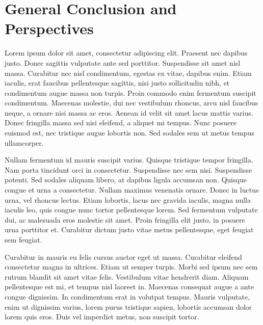 \chapter*{General Conclusion and Perspectives}




\label{chap:general-conclusion}

Lorem ipsum dolor sit amet, consectetur adipiscing elit. Praesent nec dapibus justo. Donec sagittis vulputate ante sed porttitor. Suspendisse sit amet nisl massa. Curabitur nec nisl condimentum, egestas ex vitae, dapibus enim. Etiam iaculis, erat faucibus pellentesque sagittis, nisi justo sollicitudin nibh, et condimentum augue massa non turpis. Proin commodo enim fermentum suscipit condimentum. Maecenas molestie, dui nec vestibulum rhoncus, arcu nisl faucibus neque, a ornare nisi massa ac eros. Aenean id velit sit amet lacus mattis varius. Donec fringilla massa sed nisi eleifend, a aliquet mi tempus. Nunc posuere euismod est, nec tristique augue lobortis non. Sed sodales sem ut metus tempus ullamcorper.

Nullam fermentum id mauris suscipit varius. Quisque tristique tempor fringilla. Nam porta tincidunt orci in consectetur. Suspendisse nec sem nisi. Suspendisse potenti. Sed sodales aliquam libero, at dapibus ligula accumsan non. Quisque congue et urna a consectetur. Nullam maximus venenatis ornare. Donec in luctus urna, vel rhoncus lectus. Etiam lobortis, lacus nec gravida iaculis, magna nulla iaculis leo, quis congue nunc tortor pellentesque lorem. Sed fermentum vulputate dui, ac malesuada eros molestie sit amet. Proin fringilla elit justo, in posuere urna porttitor et. Curabitur dictum justo vitae metus pellentesque, eget feugiat sem feugiat.

Curabitur in mauris eu felis cursus auctor eget ut massa. Curabitur eleifend consectetur magna in ultrices. Etiam ut semper turpis. Morbi sed ipsum nec sem rutrum blandit sit amet vitae felis. Vestibulum vitae hendrerit diam. Aliquam pellentesque est mi, et tempus nisl laoreet in. Maecenas consequat augue a ante congue dignissim. In condimentum erat in volutpat tempus. Mauris vulputate, enim ut dignissim varius, lorem purus tristique sapien, lobortis accumsan dolor lorem quis eros. Duis vel imperdiet metus, non suscipit tortor.


